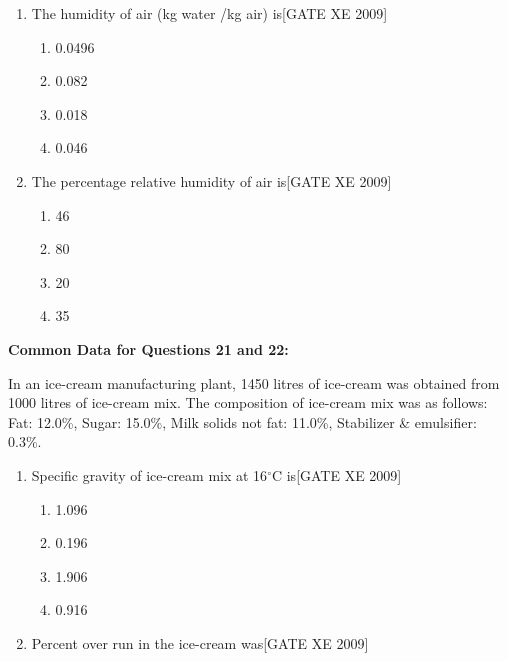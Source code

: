 \documentclass[journal,12pt,onecolumn]{IEEEtran}
\theoremstyle{remark}
\begin{document}
\begin{enumerate}
\begin{enumerate}
\begin{enumerate}[label=\textbf{Q.\arabic*.}, wide=0pt, leftmargin=*]
\item The humidity of air (kg water /kg air) is\hfill[GATE XE 2009]

\begin{multicols}{2}
\begin{enumerate}
\item 0.0496
\item 0.082
\item 0.018
\item 0.046
\end{enumerate}
\end{multicols}

\item The percentage relative humidity of air is\hfill[GATE XE 2009]

\begin{multicols}{2}
\begin{enumerate}
\item 46
\item 80
\item 20
\item 35
\end{enumerate}
\end{multicols}

\end{enumerate}
\textbf{Common Data for Questions 21 and 22:}

\vspace{0.5em}
In an ice-cream manufacturing plant, 1450 litres of ice-cream was obtained from 1000 litres of ice-cream mix.
The composition of ice-cream mix was as follows: 
Fat: 12.0\%, \quad Sugar: 15.0\%, \quad Milk solids not fat: 11.0\%, \quad Stabilizer \& emulsifier: 0.3\%.

\begin{enumerate}[start=21, label=\textbf{Q.\arabic*.}, wide=0pt, leftmargin=*]

\item Specific gravity of ice-cream mix at 16$^\circ$C is\hfill[GATE XE 2009]

\begin{multicols}{2}
\begin{enumerate}
\item 1.096
\item 0.196
\item 1.906
\item 0.916
\end{enumerate}
\end{multicols}

\item Percent over run in the ice-cream was\hfill[GATE XE 2009]


\end{enumerate}
\end{enumerate}
\end{enumerate}
\end{document}
